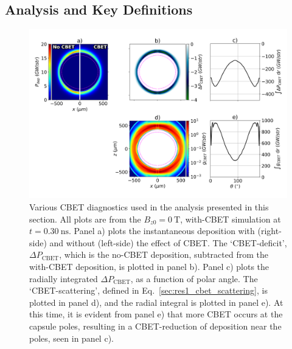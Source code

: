 \subsection{Analysis and Key Definitions}%
\label{sec:Res2_analysis_definitions}

\begin{figure}[t!]
    \includegraphics[width=\linewidth]{Results2/Images/magcbet_analysis.png}
    \centering
    \caption{Various \ac{CBET} diagnostics used in the analysis presented in this section.
    All plots are from the $B_{z0}=0\ \text{T}$, with-\ac{CBET} simulation at $t=0.30\ \text{ns}$.
    Panel a) plots the instantaneous deposition with (right-side) and without (left-side) the effect of \ac{CBET}.
    The `\ac{CBET}-deficit', $\Delta P_{\text{CBET}}$, which is the no-\ac{CBET} deposition, subtracted from the with-\ac{CBET} deposition, is plotted in panel b).
    Panel c) plots the radially integrated $\Delta P_{\text{CBET}}$, as a function of polar angle.
    The `\ac{CBET}-scattering', defined in Eq.~\ref{sec:res1_cbet_scattering}, is plotted in panel d), and the radial integral is plotted in panel e).
    At this time, it is evident from panel e) that more \ac{CBET} occurs at the capsule poles, resulting in a \ac{CBET}-reduction of deposition near the poles, seen in panel c).}%
    \label{fig:Res2_magcbet_analysis}
\end{figure}


